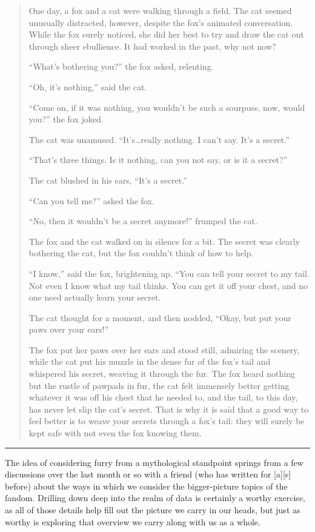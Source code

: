 \begin{quote}
One day, a fox and a cat were walking through a field. The cat seemed
unusually distracted, however, despite the fox's animated conversation.
While the fox surely noticed, she did her best to try and draw the cat
out through sheer ebullience. It had worked in the past, why not now?

``What's bothering you?'' the fox asked, relenting.

``Oh, it's nothing,'' said the cat.

``Come on, if it was nothing, you wouldn't be such a sourpuss, now,
would you?'' the fox joked.

The cat was unamused. ``It's\ldots{}really nothing. I can't say. It's a
secret.''

``That's three things. Is it nothing, can you not say, or is it a
secret?''

The cat blushed in his ears, ``It's a secret.''

``Can you tell me?'' asked the fox.

``No, then it wouldn't be a secret anymore!'' frumped the cat.

The fox and the cat walked on in silence for a bit. The secret was
clearly bothering the cat, but the fox couldn't think of how to help.

``I know,'' said the fox, brightening up. ``You can tell your secret to
my tail. Not even I know what my tail thinks. You can get it off your
chest, and no one need actually learn your secret.

The cat thought for a moment, and then nodded, ``Okay, but put your paws
over your ears!''

The fox put her paws over her ears and stood still, admiring the
scenery, while the cat put his muzzle in the dense fur of the fox's tail
and whispered his secret, weaving it through the fur. The fox heard
nothing but the rustle of pawpads in fur, the cat felt immensely better
getting whatever it was off his chest that he needed to, and the tail,
to this day, has never let slip the cat's secret. That is why it is said
that a good way to feel better is to weave your secrets through a fox's
tail: they will surely be kept safe with not even the fox knowing them.
\end{quote}

\begin{center}\rule{0.5\linewidth}{\linethickness}\end{center}

The idea of considering furry from a mythological standpoint springs
from a few discussions over the last month or so with a friend (who has
written for {[}a{]}{[}s{]} before) about the ways in which we consider
the bigger-picture topics of the fandom. Drilling down deep into the
realm of data is certainly a worthy exercise, as all of those details
help fill out the picture we carry in our heads, but just as worthy is
exploring that overview we carry along with us as a whole.

